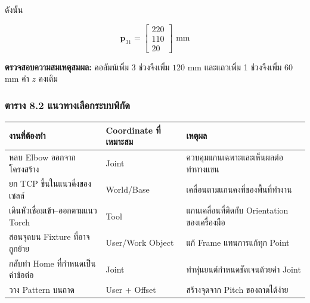 ดังนั้น

\[
\mathbf{p}_{31}=
\begin{bmatrix}220\\110\\20\end{bmatrix}\text{ mm}
\]

\textbf{ตรวจสอบความสมเหตุสมผล:} คอลัมน์เพิ่ม 3 ช่วงจึงเพิ่ม $120$ mm และแถวเพิ่ม 1 ช่วงจึงเพิ่ม $60$ mm ค่า $z$ คงเดิม

\subsubsection{ตาราง 8.2 แนวทางเลือกระบบพิกัด}

\begin{table}[htbp]
    \centering
    \begin{tabular}{l l l}
        \hline
        \textbf{งานที่ต้องทำ} & \textbf{Coordinate ที่เหมาะสม} & \textbf{เหตุผล} \\
        \hline
        หลบ Elbow ออกจากโครงสร้าง & Joint & ควบคุมแกนเฉพาะและเห็นผลต่อท่าทางแขน \\
        ยก TCP ขึ้นในแนวดิ่งของเซลล์ & World/Base & เคลื่อนตามแกนคงที่ของพื้นที่ทำงาน \\
        เดินหัวเชื่อมเข้า–ออกตามแนว Torch & Tool & แกนเคลื่อนที่ติดกับ Orientation ของเครื่องมือ \\
        สอนจุดบน Fixture ที่อาจถูกย้าย & User/Work Object & แก้ Frame แทนการแก้ทุก Point \\
        กลับท่า Home ที่กำหนดเป็นค่าข้อต่อ & Joint & ท่าหุ่นยนต์กำหนดชัดเจนด้วยค่า Joint \\
        วาง Pattern บนถาด & User + Offset & สร้างจุดจาก Pitch ของถาดได้ง่าย \\
        \hline
    \end{tabular}
\end{table}


